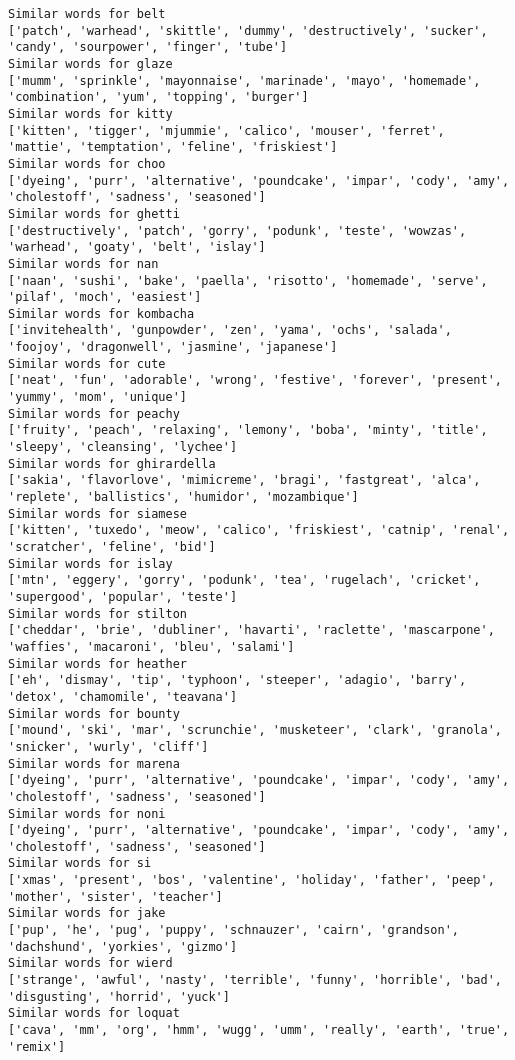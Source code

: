 \documentclass[11pt]{article}
\begin{document}
\begin{Verbatim}[commandchars=\\\{\}]
Similar words for belt
['patch', 'warhead', 'skittle', 'dummy', 'destructively', 'sucker', 'candy', 'sourpower', 'finger', 'tube']
Similar words for glaze
['mumm', 'sprinkle', 'mayonnaise', 'marinade', 'mayo', 'homemade', 'combination', 'yum', 'topping', 'burger']
Similar words for kitty
['kitten', 'tigger', 'mjummie', 'calico', 'mouser', 'ferret', 'mattie', 'temptation', 'feline', 'friskiest']
Similar words for choo
['dyeing', 'purr', 'alternative', 'poundcake', 'impar', 'cody', 'amy', 'cholestoff', 'sadness', 'seasoned']
Similar words for ghetti
['destructively', 'patch', 'gorry', 'podunk', 'teste', 'wowzas', 'warhead', 'goaty', 'belt', 'islay']
Similar words for nan
['naan', 'sushi', 'bake', 'paella', 'risotto', 'homemade', 'serve', 'pilaf', 'moch', 'easiest']
Similar words for kombacha
['invitehealth', 'gunpowder', 'zen', 'yama', 'ochs', 'salada', 'foojoy', 'dragonwell', 'jasmine', 'japanese']
Similar words for cute
['neat', 'fun', 'adorable', 'wrong', 'festive', 'forever', 'present', 'yummy', 'mom', 'unique']
Similar words for peachy
['fruity', 'peach', 'relaxing', 'lemony', 'boba', 'minty', 'title', 'sleepy', 'cleansing', 'lychee']
Similar words for ghirardella
['sakia', 'flavorlove', 'mimicreme', 'bragi', 'fastgreat', 'alca', 'replete', 'ballistics', 'humidor', 'mozambique']
Similar words for siamese
['kitten', 'tuxedo', 'meow', 'calico', 'friskiest', 'catnip', 'renal', 'scratcher', 'feline', 'bid']
Similar words for islay
['mtn', 'eggery', 'gorry', 'podunk', 'tea', 'rugelach', 'cricket', 'supergood', 'popular', 'teste']
Similar words for stilton
['cheddar', 'brie', 'dubliner', 'havarti', 'raclette', 'mascarpone', 'waffies', 'macaroni', 'bleu', 'salami']
Similar words for heather
['eh', 'dismay', 'tip', 'typhoon', 'steeper', 'adagio', 'barry', 'detox', 'chamomile', 'teavana']
Similar words for bounty
['mound', 'ski', 'mar', 'scrunchie', 'musketeer', 'clark', 'granola', 'snicker', 'wurly', 'cliff']
Similar words for marena
['dyeing', 'purr', 'alternative', 'poundcake', 'impar', 'cody', 'amy', 'cholestoff', 'sadness', 'seasoned']
Similar words for noni
['dyeing', 'purr', 'alternative', 'poundcake', 'impar', 'cody', 'amy', 'cholestoff', 'sadness', 'seasoned']
Similar words for si
['xmas', 'present', 'bos', 'valentine', 'holiday', 'father', 'peep', 'mother', 'sister', 'teacher']
Similar words for jake
['pup', 'he', 'pug', 'puppy', 'schnauzer', 'cairn', 'grandson', 'dachshund', 'yorkies', 'gizmo']
Similar words for wierd
['strange', 'awful', 'nasty', 'terrible', 'funny', 'horrible', 'bad', 'disgusting', 'horrid', 'yuck']
Similar words for loquat
['cava', 'mm', 'org', 'hmm', 'wugg', 'umm', 'really', 'earth', 'true', 'remix']

\end{Verbatim}
\end{document}
